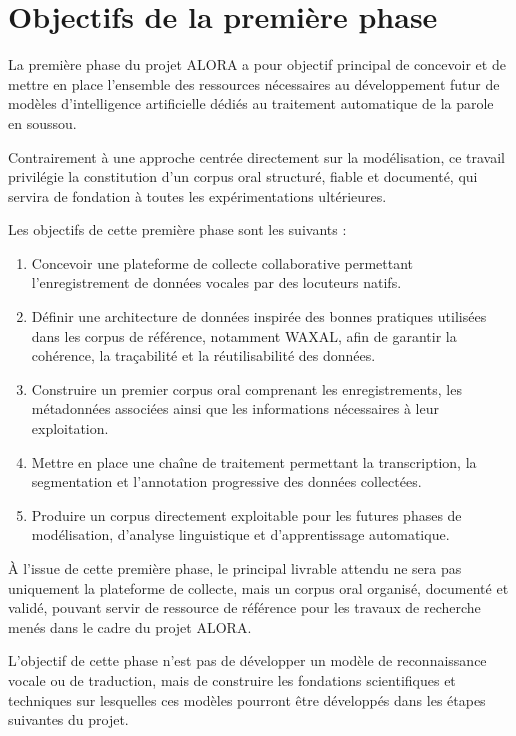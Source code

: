 \section{Objectifs de la première phase}

La première phase du projet ALORA a pour objectif principal de concevoir
et de mettre en place l'ensemble des ressources nécessaires au
développement futur de modèles d'intelligence artificielle dédiés au
traitement automatique de la parole en soussou.

Contrairement à une approche centrée directement sur la modélisation, ce
travail privilégie la constitution d'un corpus oral structuré, fiable et
documenté, qui servira de fondation à toutes les expérimentations
ultérieures.

Les objectifs de cette première phase sont les suivants :

\begin{enumerate}

\item Concevoir une plateforme de collecte collaborative permettant
l'enregistrement de données vocales par des locuteurs natifs.

\item Définir une architecture de données inspirée des bonnes pratiques
utilisées dans les corpus de référence, notamment WAXAL, afin de garantir
la cohérence, la traçabilité et la réutilisabilité des données.

\item Construire un premier corpus oral comprenant les enregistrements,
les métadonnées associées ainsi que les informations nécessaires à leur
exploitation.

\item Mettre en place une chaîne de traitement permettant la
transcription, la segmentation et l'annotation progressive des données
collectées.

\item Produire un corpus directement exploitable pour les futures phases
de modélisation, d'analyse linguistique et d'apprentissage automatique.

\end{enumerate}

À l'issue de cette première phase, le principal livrable attendu ne sera
pas uniquement la plateforme de collecte, mais un corpus oral organisé,
documenté et validé, pouvant servir de ressource de référence pour les
travaux de recherche menés dans le cadre du projet ALORA.

\begin{important}

L'objectif de cette phase n'est pas de développer un modèle de
reconnaissance vocale ou de traduction, mais de construire les
fondations scientifiques et techniques sur lesquelles ces modèles
pourront être développés dans les étapes suivantes du projet.

\end{important}